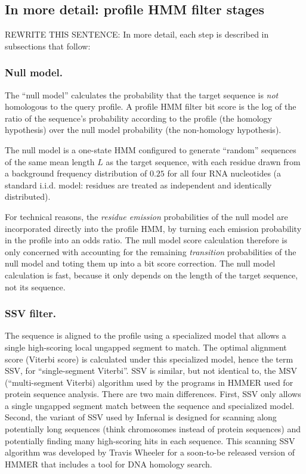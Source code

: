 \subsection{In more detail: profile HMM filter stages}

REWRITE THIS SENTENCE: In more detail, each step is described in subsections that follow:

\subsubsection{Null model.}

The ``null model'' calculates the probability that the target sequence
is \emph{not} homologous to the query profile. A profile HMM filter
bit score is the log of the ratio of the sequence's probability
according to the profile (the homology hypothesis) over the null model
probability (the non-homology hypothesis).

The null model is a one-state HMM configured to generate ``random''
sequences of the same mean length $L$ as the target sequence, with
each residue drawn from a background frequency distribution of $0.25$
for all four RNA nucleotides (a
standard i.i.d. model: residues are treated as independent and
identically distributed). 

For technical reasons, the \emph{residue emission} probabilities of
the null model are incorporated directly into
the profile HMM, by turning each emission probability in the profile into
an odds ratio. The null model score calculation therefore is only
concerned with accounting for the remaining \emph{transition}
probabilities of the null model and toting them up into a bit score
correction.  The null model calculation is fast, because it only
depends on the length of the target sequence, not its sequence.

\subsubsection{SSV filter.}

The sequence is aligned to the profile using a specialized model that
allows a single high-scoring local ungapped segment to match.  The
optimal alignment score (Viterbi score) is calculated under this
specialized model, hence the term SSV, for ``single-segment
Viterbi''. SSV is similar, but not identical to, the MSV
(``multi-segment Viterbi) algorithm used by the programs in HMMER used
for protein sequence analysis. There are two main differences. First,
SSV only allows a single ungapped segment match between the sequence
and specialized model. Second, the variant of SSV used by Infernal is
designed for scanning along potentially long sequences (think
chromosomes instead of protein sequences) and potentially finding many
high-scoring hits in each sequence. This scanning SSV algorithm was
developed by Travis Wheeler for a soon-to-be released version of HMMER
that includes a tool for DNA homology search.

